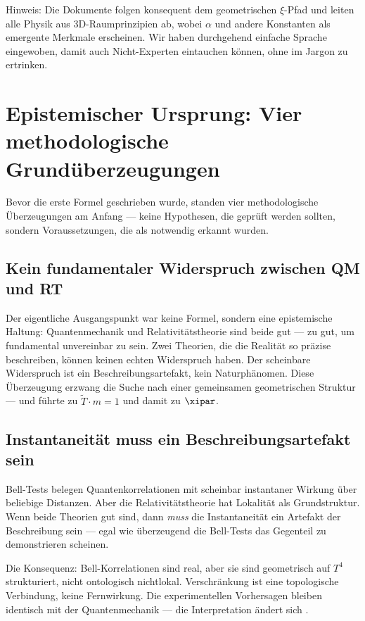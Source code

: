 	Hinweis: Die Dokumente folgen konsequent dem geometrischen $\xi$-Pfad und leiten alle Physik aus 3D-Raumprinzipien ab, wobei $\alpha$ und andere Konstanten als emergente Merkmale erscheinen. Wir haben durchgehend einfache Sprache eingewoben, damit auch Nicht-Experten eintauchen können, ohne im Jargon zu ertrinken.
	
	\section{Epistemischer Ursprung: Vier methodologische Grundüberzeugungen}

Bevor die erste Formel geschrieben wurde, standen vier methodologische Überzeugungen am Anfang --- keine Hypothesen, die geprüft werden sollten, sondern Voraussetzungen, die als notwendig erkannt wurden.

\subsection{Kein fundamentaler Widerspruch zwischen QM und RT}

Der eigentliche Ausgangspunkt war keine Formel, sondern eine epistemische Haltung: Quantenmechanik und Relativitätstheorie sind beide gut --- zu gut, um fundamental unvereinbar zu sein. Zwei Theorien, die die Realität so präzise beschreiben, können keinen echten Widerspruch haben. Der scheinbare Widerspruch ist ein Beschreibungsartefakt, kein Naturphänomen. Diese Überzeugung erzwang die Suche nach einer gemeinsamen geometrischen Struktur --- und führte zu $\tilde{T} \cdot m = 1$ und damit zu $\xipar$.

\subsection{Instantaneität muss ein Beschreibungsartefakt sein}

Bell-Tests belegen Quantenkorrelationen mit scheinbar instantaner Wirkung über beliebige Distanzen. Aber die Relativitätstheorie hat Lokalität als Grundstruktur. Wenn beide Theorien gut sind, dann \emph{muss} die Instantaneität ein Artefakt der Beschreibung sein --- egal wie überzeugend die Bell-Tests das Gegenteil zu demonstrieren scheinen.

Die Konsequenz: Bell-Korrelationen sind real, aber sie sind geometrisch auf $T^4$ strukturiert, nicht ontologisch nichtlokal. Verschränkung ist eine topologische Verbindung, keine Fernwirkung. Die experimentellen Vorhersagen bleiben identisch mit der Quantenmechanik --- die Interpretation ändert sich \cite{Hilbertraum2026}.

